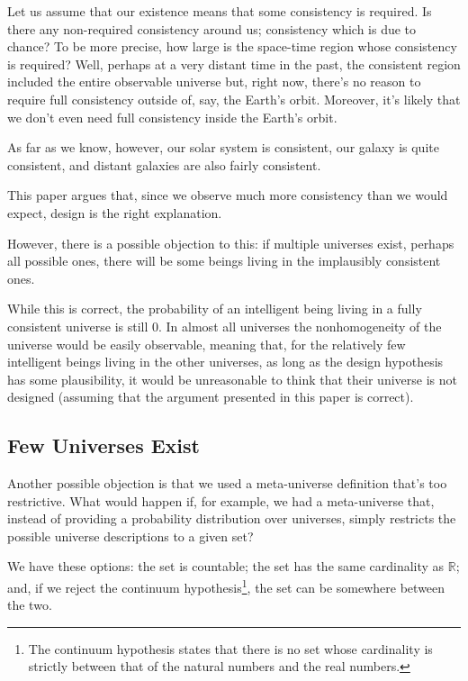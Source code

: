 \documentclass[a4paper
,draft
]{article}
\def\reale{\mathbb{R}}
\newcommand{\paper}[1]{paper}
\begin{document}
Let us assume that our existence means that some consistency is required.
Is there any non-required consistency around us; consistency which is due to
chance? To be more precise,
how large is the space-time region whose consistency is required? Well,
perhaps at a very distant time in the past, the consistent region included
the entire observable universe but, right now, there's no reason to require
full consistency outside of, say, the Earth's orbit. Moreover,
it's likely that we don't even need full consistency inside the Earth's orbit.

As far as we know, however, our solar system is consistent, our galaxy is
quite consistent, and distant galaxies are also fairly consistent.

This \paper{} argues that, since we observe much more consistency
than we would expect, design is the right explanation.

However, there is a possible objection to this: if multiple universes
exist, perhaps all possible ones, there will be some beings living in the
implausibly consistent ones.

While this is correct, the probability of an intelligent being
living in a fully consistent universe is still $0$.
In almost all universes the nonhomogeneity of the universe would be
easily observable, meaning that, for the relatively few intelligent beings
living in the other universes, as long as the design hypothesis
has some plausibility, it would be unreasonable to think that
their universe is not designed (assuming that the argument presented in
this \paper{} is correct).

\subsection{Few Universes Exist}
\label{sec:fewuniverses}

Another possible objection is that we used a meta-universe definition that's too
restrictive. What would happen if, for example, we had a meta-universe that, instead
of providing a probability distribution over universes, simply restricts the
possible universe descriptions to a given set?

We have these options: the set is countable; the set has the same cardinality
as $\reale$; and, if we reject the continuum hypothesis\footnote{
  The continuum hypothesis states that there is no set whose cardinality is
  strictly between that of the natural numbers and the real numbers.
}, the set can be somewhere between the two.
\end{document}

